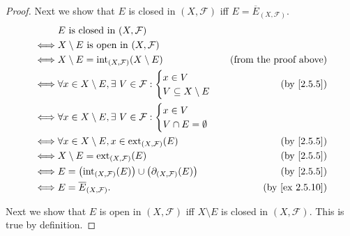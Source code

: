 \begin{proof}
  Next we show that \(E\) is closed in \((X, \mathcal{F})\) iff \(E = \overline{E}_{(X, \mathcal{F})}\).
  \begin{align*}
         & E \text{ is closed in } (X, \mathcal{F})                                                                                     \\
    \iff & X \setminus E \text{ is open in } (X, \mathcal{F})                                                                           \\
    \iff & X \setminus E = \text{int}_{(X, \mathcal{F})}(X \setminus E)                                 & \text{(from the proof above)} \\
    \iff & \forall x \in X \setminus E, \exists\ V \in \mathcal{F} : \begin{cases}
                                                                       x \in V \\
                                                                       V \subseteq X \setminus E
                                                                     \end{cases}                      & \text{(by \cref{2.5.5})}        \\
    \iff & \forall x \in X \setminus E, \exists\ V \in \mathcal{F} : \begin{cases}
                                                                       x \in V \\
                                                                       V \cap E = \emptyset
                                                                     \end{cases}                                                \\
    \iff & \forall x \in X \setminus E, x \in \text{ext}_{(X, \mathcal{F})}(E)                          & \text{(by \cref{2.5.5})}      \\
    \iff & X \setminus E = \text{ext}_{(X, \mathcal{F})}(E)                                             & \text{(by \cref{2.5.5})}      \\
    \iff & E = \big(\text{int}_{(X, \mathcal{F})}(E)\big) \cup \big(\partial_{(X, \mathcal{F})}(E)\big) & \text{(by \cref{2.5.5})}      \\
    \iff & E = \overline{E}_{(X, \mathcal{F})}.                                                         & \text{(by \cref{ex 2.5.10})}
  \end{align*}

  Next we show that \(E\) is open in \((X, \mathcal{F})\) iff \(X \setminus E\) is closed in \((X, \mathcal{F})\).
  This is true by definition.


\end{proof}
